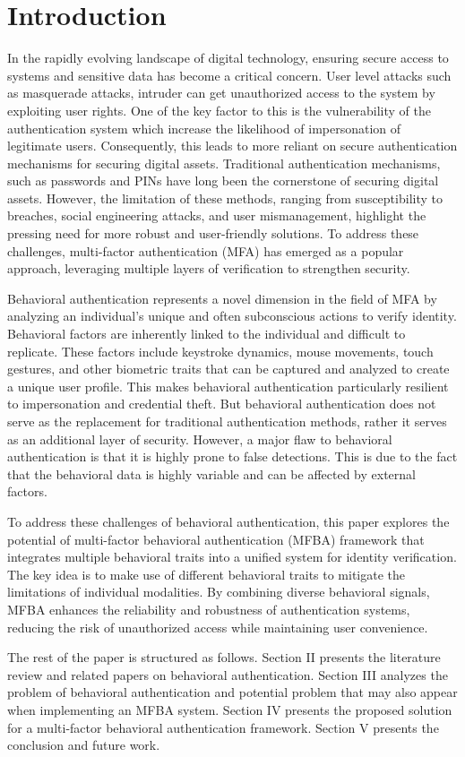 
\section{Introduction}

In the rapidly evolving landscape of digital technology, ensuring secure access to systems and sensitive data has become a critical concern.
User level attacks such as masquerade attacks, intruder can get unauthorized access to the system by exploiting user rights.
One of the key factor to this is the vulnerability of the authentication system
which increase the likelihood of impersonation of legitimate users.
Consequently, this leads to more reliant on secure authentication mechanisms for securing digital assets.  
Traditional authentication mechanisms, such as passwords and PINs have long been the cornerstone of securing digital assets. However, the limitation of these methods, ranging from susceptibility to breaches, social engineering attacks, and user mismanagement, highlight the pressing need for more robust and user-friendly solutions. To address these challenges, multi-factor authentication (MFA) has emerged as a popular approach, leveraging multiple layers of verification to strengthen security.

Behavioral authentication represents a novel dimension in the field of MFA by analyzing an individual's unique and often subconscious actions to verify identity.
Behavioral factors are inherently linked to the individual and difficult to replicate.
These factors include keystroke dynamics, mouse movements, touch gestures, and other biometric traits that can be captured and analyzed to create a unique user profile.
This makes behavioral authentication particularly resilient to impersonation and credential theft.
But behavioral authentication does not serve as the replacement for traditional authentication methods, rather it serves as an additional layer of security. 
However, a major flaw to behavioral authentication is that it is highly prone to false detections.
This is due to the fact that the behavioral data is highly variable and can be affected by external factors.

To address these challenges of behavioral authentication, 
this paper explores the potential of multi-factor behavioral authentication (MFBA) framework that integrates multiple behavioral traits into a unified system for identity verification.
The key idea is to make use of different behavioral traits to mitigate the limitations of individual modalities.
By combining diverse behavioral signals, MFBA enhances the reliability and robustness of authentication systems, reducing the risk of unauthorized access while maintaining user convenience.

The rest of the paper is structured as follows.
Section II presents the literature review and related papers on behavioral authentication.
Section III analyzes the problem of behavioral authentication and potential problem that may also appear when implementing an MFBA system. 
Section IV presents the proposed solution for a multi-factor behavioral authentication framework.
Section V presents the conclusion and future work.
